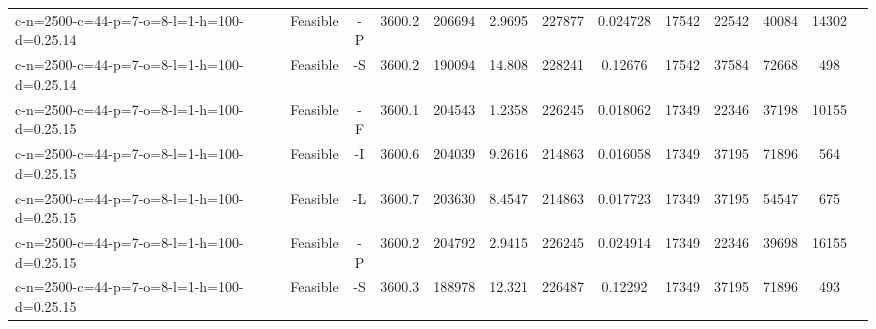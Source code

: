 \documentclass[landscape, a4paper]{article}
\begin{document}
\begin{center}
\begin{tabular}{lcccccccccccc}
c-n=2500-c=44-p=7-o=8-l=1-h=100-d=0.25.14 & Feasible & -P & 3600.2 & 206694 & 2.9695 & 227877 & 0.024728 & 17542 & 22542 & 40084 & 14302 & \\
c-n=2500-c=44-p=7-o=8-l=1-h=100-d=0.25.14 & Feasible & -S & 3600.2 & 190094 & 14.808 & 228241 & 0.12676 & 17542 & 37584 & 72668 & 498 & \\
c-n=2500-c=44-p=7-o=8-l=1-h=100-d=0.25.15 & Feasible & -F & 3600.1 & 204543 & 1.2358 & 226245 & 0.018062 & 17349 & 22346 & 37198 & 10155 & \\
c-n=2500-c=44-p=7-o=8-l=1-h=100-d=0.25.15 & Feasible & -I & 3600.6 & 204039 & 9.2616 & 214863 & 0.016058 & 17349 & 37195 & 71896 & 564 & \\
c-n=2500-c=44-p=7-o=8-l=1-h=100-d=0.25.15 & Feasible & -L & 3600.7 & 203630 & 8.4547 & 214863 & 0.017723 & 17349 & 37195 & 54547 & 675 & \\
c-n=2500-c=44-p=7-o=8-l=1-h=100-d=0.25.15 & Feasible & -P & 3600.2 & 204792 & 2.9415 & 226245 & 0.024914 & 17349 & 22346 & 39698 & 16155 & \\
c-n=2500-c=44-p=7-o=8-l=1-h=100-d=0.25.15 & Feasible & -S & 3600.3 & 188978 & 12.321 & 226487 & 0.12292 & 17349 & 37195 & 71896 & 493 & \\
\end{tabular}
\end{center}
\end{document}
